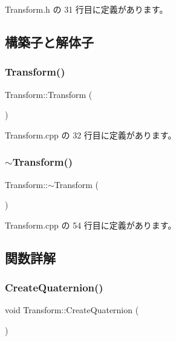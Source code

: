  Transform.\+h の 31 行目に定義があります。



\subsection{構築子と解体子}
\mbox{\label{class_transform_aa08ca4266efabc768973cdeea51945ab}} 
\subsubsection{\texorpdfstring{Transform()}{Transform()}}
{\footnotesize\ttfamily Transform\+::\+Transform (\begin{DoxyParamCaption}{ }\end{DoxyParamCaption})}



 Transform.\+cpp の 32 行目に定義があります。

\mbox{\label{class_transform_aa72e286c069850db80927b0e6554cd3e}} 
\subsubsection{\texorpdfstring{$\sim$\+Transform()}{~Transform()}}
{\footnotesize\ttfamily Transform\+::$\sim$\+Transform (\begin{DoxyParamCaption}{ }\end{DoxyParamCaption})}



 Transform.\+cpp の 54 行目に定義があります。



\subsection{関数詳解}
\mbox{\label{class_transform_a7884cb828ace5c921e7138d83c43d689}} 
\subsubsection{\texorpdfstring{Create\+Quaternion()}{CreateQuaternion()}}
{\footnotesize\ttfamily void Transform\+::\+Create\+Quaternion (\begin{DoxyParamCaption}{ }\end{DoxyParamCaption})\hspace{0.3cm}{\ttfamily [private]}}



